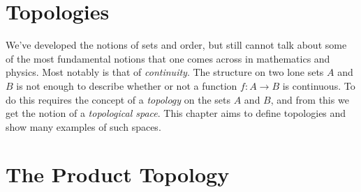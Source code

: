 \begingroup
    \ifcsname\PATH\endcsname
        \newcommand{\PATH}{books/Topology/Topological_Spaces}
        \newcommand{\OLDPATH}{\PATH}
    \else
        \newcommand{\OLDPATH}{\PATH}
        \renewcommand{\PATH}{books/Topology/Topological_Spaces}
    \fi
    \chapter{Topologies}
        We've developed the notions of sets and order, but still cannot talk
        about some of the most fundamental notions that one comes across in
        mathematics and physics. Most notably is that of \textit{continuity}.
        The structure on two lone sets $A$ and $B$ is not enough to describe
        whether or not a function $f:A\rightarrow{B}$ is continuous. To do this
        requires the concept of a \textit{topology} on the sets $A$ and $B$, and
        from this we get the notion of a \textit{topological space}. This
        chapter aims to define topologies and show many examples of such spaces.
        
    \chapter{The Product Topology}
        

    \renewcommand{\PATH}{\OLDPATH}
\endgroup